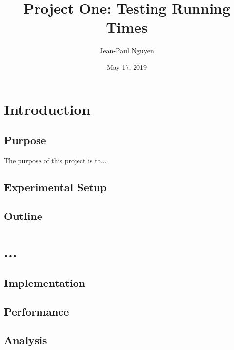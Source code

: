 \documentclass{article}
\title{Project One: Testing Running Times}
\author{Jean-Paul Nguyen}
\date{May 17, 2019}
\begin{document}
\maketitle

\newcommand{\nextblurb}[0]{\vspace{1 em} \newline \noindent}

\section{Introduction}
\subsection{Purpose}
    The purpose of this project is to...
\subsection{Experimental Setup}
\subsection{Outline}

\section{...}
\subsection{Implementation}
\subsection{Performance}
\subsection{Analysis}
\end{document}
